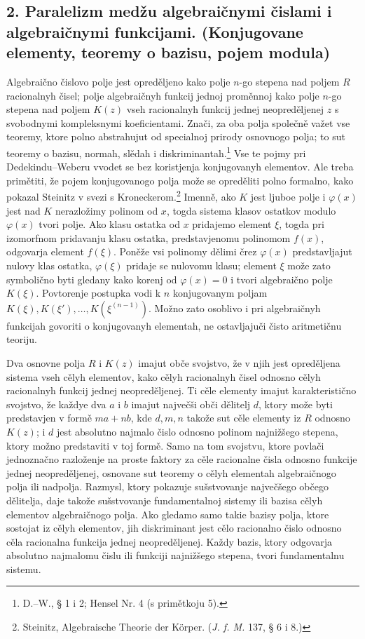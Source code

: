 \documentclass[11pt]{article}
\begin{document}
\subsection*{2. Paralelizm medžu algebraičnymi čislami i algebraičnymi funkcijami. (Konjugovane elementy, teoremy o bazisu, pojem modula)}
Algebraično čislovo polje jest opreděljeno kako polje \(n\)-go stepena nad poljem \(R\) racionalnyh čisel; polje algebraičnyh funkcij jednoj proměnnoj kako polje \(n\)-go stepena nad poljem \(K(z)\) vseh racionalnyh funkcij jednej neopreděljenej \(z\) s svobodnymi kompleksnymi koeficientami. Znači, za oba polja společně važet vse teoremy, ktore polno abstrahujut od specialnoj prirody osnovnogo polja; to sut teoremy o bazisu, normah, slědah i diskriminantah.\footnote{D.--W., § 1 i 2; Hensel Nr. 4 (s primětkoju 5).} Vse te pojmy pri Dedekindu--Weberu vvodet se bez koristjenja konjugovanyh elementov. Ale treba primětiti, že pojem konjugovanogo polja može se opreděliti polno formalno, kako pokazal Steinitz v svezi s Kroneckerom.\footnote{Steinitz, Algebraische Theorie der Körper. (\emph{J. f. M.} 137, § 6 i 8.)} Imenně, ako \(K\) jest ljuboe polje i \(\varphi(x)\) jest nad \(K\) nerazložimy polinom od \(x\), togda sistema klasov ostatkov modulo \(\varphi(x)\) tvori polje. Ako klasu ostatka od \(x\) pridajemo element \(\xi\), togda pri izomorfnom pridavanju klasu ostatka, predstavjenomu polinomom \(f(x)\), odgovarja element \(f(\xi)\). Poněže vsi polinomy dělimi črez \(\varphi(x)\) predstavljajut nulovy klas ostatka, \(\varphi(\xi)\) pridaje se nulovomu klasu; element \(\xi\) može zato symbolično byti gledany kako korenj od \(\varphi(x)=0\) i tvori algebraično polje \(K(\xi)\). Povtorenje postupka vodi k \(n\) konjugovanym poljam \(K(\xi), K(\xi'),\ldots,K(\xi^{(n-1)})\). Možno zato osoblivo i pri algebraičnyh funkcijah govoriti o konjugovanyh elementah, ne ostavljajuči čisto aritmetičnu teoriju.

Dva osnovne polja \(R\) i \(K(z)\) imajut obče svojstvo, že v njih jest opreděljena sistema vseh cělyh elementov, kako cělyh racionalnyh čisel odnosno cělyh racionalnyh funkcij jednej neopreděljenej. Ti cěle elementy imajut karakteristično svojstvo, že každye dva \(a\) i \(b\) imajut največši obči dělitelj \(d\), ktory može byti predstavjen v formě \(ma+nb\), kde \(d,m,n\) takože sut cěle elementy iz \(R\) odnosno \(K(z)\); i \(d\) jest absolutno najmalo čislo odnosno polinom najnižšego stepena, ktory možno predstaviti v toj formě. Samo na tom svojstvu, ktore povlači jednoznačno razloženje na proste faktory za cěle racionalne čisla odnosno funkcije jednej neopreděljenej, osnovane sut teoremy o cělyh elementah algebraičnogo polja ili nadpolja. Razmysl, ktory pokazuje sušstvovanje največšego občego dělitelja, daje takože sušstvovanje fundamentalnoj sistemy ili bazisa cělyh elementov algebraičnogo polja. Ako gledamo samo takie bazisy polja, ktore sostojat iz cělyh elementov, jih diskriminant jest cělo racionalno čislo odnosno cěla racionalna funkcija jednej neopreděljenej. Každy bazis, ktory odgovarja absolutno najmalomu čislu ili funkciji najnižšego stepena, tvori fundamentalnu sistemu.
\end{document}
